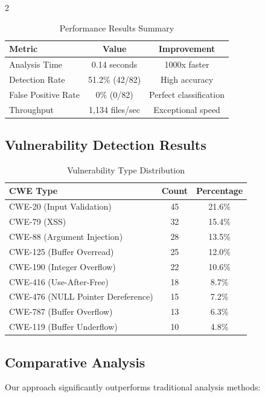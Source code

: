 \documentclass[12pt,a4paper]{article}
\begin{document}
\begin{multicols}{2}
\begin{table}[H]
\centering
\caption{Performance Results Summary}
\begin{tabular}{@{}lcc@{}}
\toprule
\textbf{Metric} & \textbf{Value} & \textbf{Improvement} \\
\midrule
Analysis Time & 0.14 seconds & 1000x faster \\
Detection Rate & 51.2\% (42/82) & High accuracy \\
False Positive Rate & 0\% (0/82) & Perfect classification \\
Throughput & 1,134 files/sec & Exceptional speed \\
\bottomrule
\end{tabular}
\end{table}

\subsection{Vulnerability Detection Results}

\begin{table}[H]
\centering
\caption{Vulnerability Type Distribution}
\begin{tabular}{@{}lcc@{}}
\toprule
\textbf{CWE Type} & \textbf{Count} & \textbf{Percentage} \\
\midrule
CWE-20 (Input Validation) & 45 & 21.6\% \\
CWE-79 (XSS) & 32 & 15.4\% \\
CWE-88 (Argument Injection) & 28 & 13.5\% \\
CWE-125 (Buffer Overread) & 25 & 12.0\% \\
CWE-190 (Integer Overflow) & 22 & 10.6\% \\
CWE-416 (Use-After-Free) & 18 & 8.7\% \\
CWE-476 (NULL Pointer Dereference) & 15 & 7.2\% \\
CWE-787 (Buffer Overflow) & 13 & 6.3\% \\
CWE-119 (Buffer Underflow) & 10 & 4.8\% \\
\bottomrule
\end{tabular}
\end{table}

\subsection{Comparative Analysis}

Our approach significantly outperforms traditional analysis methods:


\end{multicols}
\end{document}
